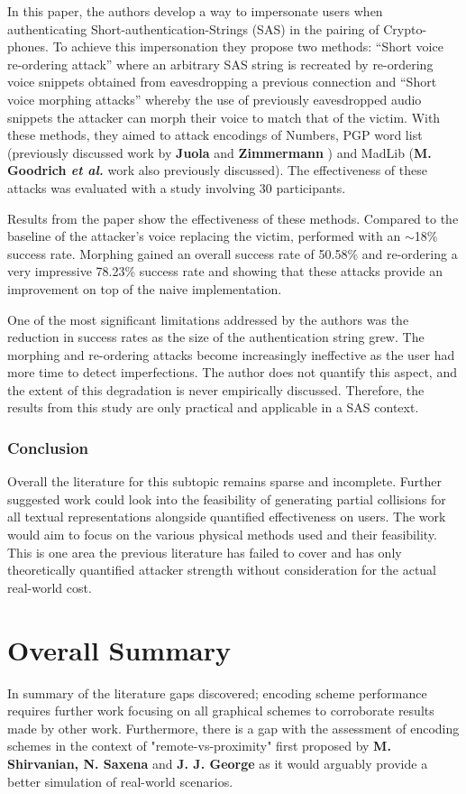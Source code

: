 In this paper, the authors develop a way to 
impersonate users when authenticating 
Short-authentication-Strings (SAS) in the pairing of 
Crypto-phones. To achieve this impersonation they propose 
two methods: ``Short voice re-ordering attack'' where an 
arbitrary SAS string is recreated by re-ordering voice snippets 
obtained from eavesdropping a previous connection
and ``Short voice morphing attacks'' whereby the use of 
previously eavesdropped audio snippets the attacker can
morph their voice to match that of the victim. With 
these methods, they aimed to attack encodings of Numbers, 
PGP word list (previously discussed work by \textbf{Juola} and 
\textbf{Zimmermann} \cite{juola1996whole}) and MadLib (\textbf{M. Goodrich 
\textit{et al.}}\cite{goodrich2006loud} work also 
previously discussed). The effectiveness of these attacks 
was evaluated with a study involving 30 participants.

Results from the paper show the effectiveness of these 
methods. Compared to the baseline of the attacker's voice 
replacing the victim, performed with an $\sim$18\% success rate. Morphing gained an overall success rate of 50.58\% and re-ordering a very impressive 78.23\% success rate and showing that these attacks provide an improvement on top of the naive implementation.

One of the most significant limitations addressed by the authors  was the reduction in success rates as the size of the authentication string grew. The morphing and re-ordering  attacks become increasingly ineffective as the user had more time to detect imperfections. The author does not quantify this aspect, and the extent of this degradation is never empirically discussed. Therefore, the results from this study are only practical and applicable in a SAS context.

\subsubsection*{Conclusion}
Overall the literature for this subtopic remains sparse and incomplete. Further suggested work could look into the feasibility of generating partial collisions for all textual representations alongside quantified effectiveness on users. The work would aim to focus on the various physical methods used and their feasibility. This is one area the previous literature has failed to cover and has only theoretically quantified attacker strength without consideration for the actual real-world cost.

\section{Overall Summary}
In summary of the literature gaps discovered; encoding scheme performance requires further work focusing on all graphical schemes to corroborate results made by other work. Furthermore, there is a gap with the assessment of encoding schemes in the context of "remote-vs-proximity" first proposed by \textbf{M. Shirvanian, N. Saxena} and \textbf{J. J. George}\cite{shirvanian2017pitfalls} as it would arguably provide a better simulation of real-world scenarios.

